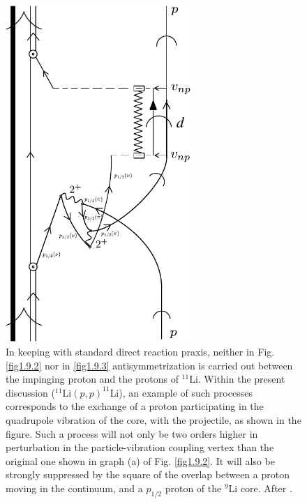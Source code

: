               \begin{figure}[h!]
               \centerline {
               \includegraphics*[width=7cm]{introduccion/figs/fig1_9_4}
               }
               \caption[Antisymmetrization contribution to $^{11}$Li$(p,p)^{11}$Li.]{ In keeping with standard direct reaction praxis, neither in Fig. \ref{fig1.9.2} nor in
               \ref{fig1.9.3} antisymmetrization is carried out between the impinging proton and the protons
               of $^{11}$Li. Within the present discussion
               ($^{11}$Li$(p,p)^{11}$Li), an example of such processes corresponds to the exchange
               of a proton participating in the quadrupole vibration of the core, with the projectile, as
               shown in the figure. Such a process will not only be two orders higher in perturbation
               in the particle-vibration coupling vertex than the original one shown in graph (a) of Fig. \ref{fig1.9.2}. It will also be strongly suppressed by the square of
               the overlap between a proton moving in the continuum, and a $p_{1/2}$ proton of the $^{9}$Li
               core. After \cite{Broglia:16}.}
               \label{fig1.9.4}
               \end{figure}
          
